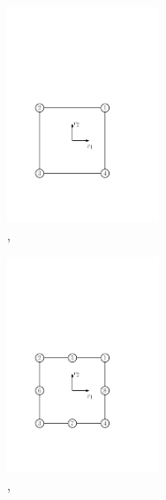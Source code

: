 \begin{figure}[htb]
  \begin{subfigure}{0.5\textwidth}
    \centering
    \includegraphics[width=0.5\textwidth]{quadrangle4}
    \caption{, }
    \label{fig:EL:SURFLOAD:QUADRANGLE4}
  \end{subfigure}
  \begin{subfigure}{0.5\textwidth}
    \centering
    \includegraphics[width=0.5\textwidth]{quadrangle8}
    \caption{, }
    \label{fig:EL:SURFLOAD:QUADRANGLE8}
  \end{subfigure}
  \begin{subfigure}{0.5\textwidth}
    \centering

\end{subfigure}
\end{figure}
